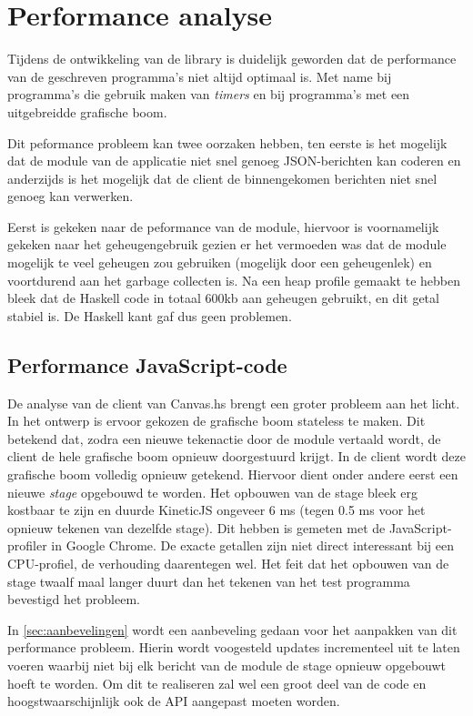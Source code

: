 \section{Performance analyse} \label{sec:performance}

Tijdens de ontwikkeling van de library is duidelijk geworden dat de performance van de geschreven programma's niet altijd optimaal is. Met name bij programma's die gebruik maken van \emph{timers} en bij programma's met een uitgebreidde grafische boom.

Dit peformance probleem kan twee oorzaken hebben, ten eerste is het mogelijk dat de module van de applicatie niet snel genoeg JSON-berichten kan coderen en anderzijds is het mogelijk dat de client de binnengekomen berichten niet snel genoeg kan verwerken.

Eerst is gekeken naar de peformance van de module, hiervoor is voornamelijk gekeken naar het geheugengebruik gezien er het vermoeden was dat de module mogelijk te veel geheugen zou gebruiken (mogelijk door een geheugenlek) en voortdurend aan het garbage collecten is. Na een heap profile gemaakt te hebben bleek dat de Haskell code in totaal 600kb aan geheugen gebruikt, en dit getal stabiel is. De Haskell kant gaf dus geen problemen.

\subsection{Performance JavaScript-code}

De analyse van de client van Canvas.hs brengt een groter probleem aan het licht. In het ontwerp is ervoor gekozen de grafische boom stateless te maken. Dit betekend dat, zodra een nieuwe tekenactie door de module vertaald wordt, de client de hele grafische boom opnieuw doorgestuurd krijgt. In de client wordt deze grafische boom volledig opnieuw getekend. Hiervoor dient onder andere eerst een nieuwe \emph{stage} opgebouwd te worden.
Het opbouwen van de stage bleek erg kostbaar te zijn en duurde KineticJS ongeveer 6 ms (tegen 0.5 ms voor het opnieuw tekenen van dezelfde stage). Dit hebben is gemeten met de JavaScript-profiler in Google Chrome. De exacte getallen zijn niet direct interessant bij een CPU-profiel, de verhouding daarentegen wel. Het feit dat het opbouwen van de stage twaalf maal langer duurt dan het tekenen van het test programma bevestigd het probleem.

In \autoref{sec:aanbevelingen} wordt een aanbeveling gedaan voor het aanpakken van dit performance probleem. Hierin wordt voogesteld updates incrementeel uit te laten voeren waarbij niet bij elk bericht van de module de stage opnieuw opgebouwt hoeft te worden. Om dit te realiseren zal wel een groot deel van de code en hoogstwaarschijnlijk ook de API aangepast moeten worden.

